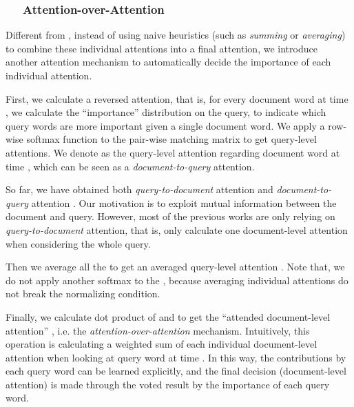\documentclass[11pt,a4paper]{article}
\begin{document}
\subsubsection*{~~ Attention-over-Attention}
Different from , instead of using naive heuristics (such as {\em summing} or {\em averaging}) to combine these individual attentions into a final attention, we introduce another attention mechanism to automatically decide the importance of each individual attention.

First, we calculate a reversed attention, that is, for every document word at time , we calculate the ``importance'' distribution on the query, to indicate which query words are more important given a single document word.
We apply a row-wise softmax function to the pair-wise matching matrix  to get query-level attentions. We denote  as the query-level attention regarding document word at time , which can be seen as a {\em document-to-query} attention. 


So far, we have obtained both {\em query-to-document} attention  and  {\em document-to-query} attention . 
Our motivation is to exploit mutual information between the document and query. 
However, most of the previous works are only relying on {\em query-to-document} attention, that is, only calculate one document-level attention when considering the whole query. 

Then we average all the  to get an averaged query-level attention . Note that, we do not apply another softmax to the , because averaging individual attentions do not break the normalizing condition.


Finally, we calculate dot product of  and  to get the ``attended document-level attention'' , i.e. the {\em attention-over-attention} mechanism. 
Intuitively, this operation is calculating a weighted sum of each individual document-level attention  when looking at query word at time .
In this way, the contributions by each query word can be learned explicitly, and the final decision (document-level attention) is made through the voted result by the importance of each query word.
\end{document}
